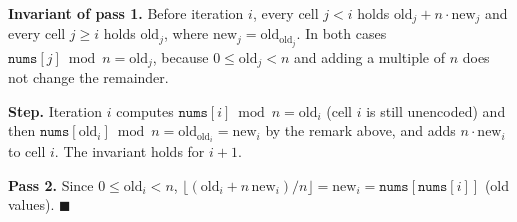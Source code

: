\begin{invariantbox}
\textbf{Invariant of pass 1.} Before iteration $i$, every cell $j < i$ holds $\text{old}_j + n \cdot \text{new}_j$ and every cell $j \ge i$ holds $\text{old}_j$, where $\text{new}_j = \text{old}_{\text{old}_j}$. In both cases $\texttt{nums}[j] \bmod n = \text{old}_j$, because $0 \le \text{old}_j < n$ and adding a multiple of $n$ does not change the remainder.

\textbf{Step.} Iteration $i$ computes $\texttt{nums}[i] \bmod n = \text{old}_i$ (cell $i$ is still unencoded) and then $\texttt{nums}[\text{old}_i] \bmod n = \text{old}_{\text{old}_i} = \text{new}_i$ by the remark above, and adds $n \cdot \text{new}_i$ to cell $i$. The invariant holds for $i+1$.

\textbf{Pass 2.} Since $0 \le \text{old}_i < n$, $\lfloor (\text{old}_i + n\,\text{new}_i)/n \rfloor = \text{new}_i = \texttt{nums}[\texttt{nums}[i]]$ (old values). \hfill$\blacksquare$
\end{invariantbox}


